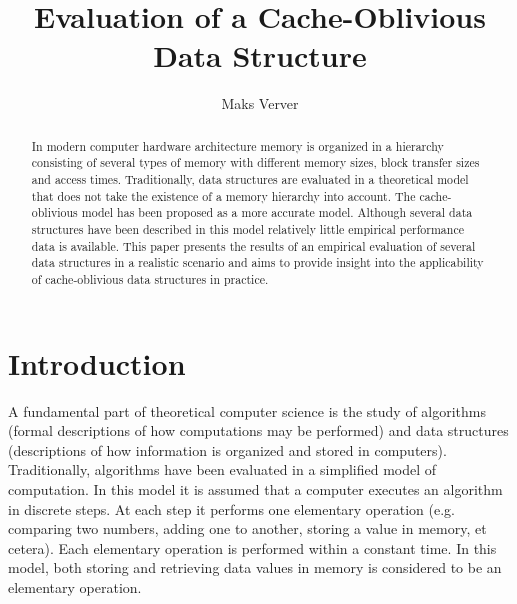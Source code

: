 \documentclass{acm_proc_article-sp}
\begin{document}
\title{Evaluation of a Cache-Oblivious Data Structure}

\author{Maks Verver\\ }


\maketitle

\begin{abstract}
In modern computer hardware architecture memory is organized in a hierarchy
consisting of several types of memory with different memory sizes, block
transfer sizes and access times.
Traditionally, data structures are evaluated in a theoretical model that
does not take the existence of a memory hierarchy into account. The
cache-oblivious model has been proposed as a more accurate model.
Although several data structures have been described in this model
relatively little empirical performance data is available.
This paper presents the results of an empirical evaluation of several data
structures in a realistic scenario and aims to provide insight into
the applicability of cache-oblivious data structures in practice.
\end{abstract}


\section{Introduction}
A fundamental part of theoretical computer science is the study of algorithms (formal descriptions of how computations may be performed) and data structures (descriptions of how information is organized and stored in computers). Traditionally, algorithms have been evaluated in a simplified model of computation. In this model it is assumed that a computer executes an algorithm in discrete steps. At each step it performs one elementary operation (e.g. comparing two numbers, adding one to another, storing a value in memory, et cetera). Each elementary operation is performed within a constant time. In this model, both storing and retrieving data values in memory is considered to be an elementary operation.
\end{document}
